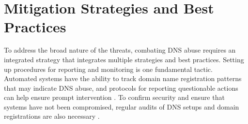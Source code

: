 \section{Mitigation Strategies and Best Practices }

To address the broad nature of the threats, combating DNS abuse requires an integrated strategy that integrates multiple strategies and best practices. Setting up procedures for reporting and monitoring is one fundamental tactic. Automated systems have the ability to track domain name registration patterns that may indicate DNS abuse, and protocols for reporting questionable actions can help ensure prompt intervention \cite{icannndnssec}. To confirm security and ensure that systems have not been compromised, regular audits of DNS setups and domain registrations are also necessary \cite{lucas2021tls} .

